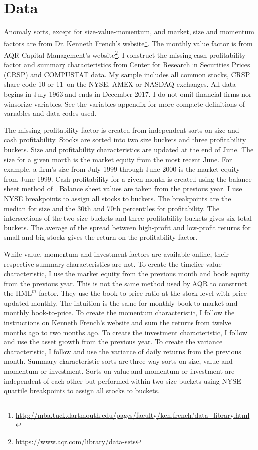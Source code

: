 
\section*{Data}

Anomaly sorts, except for size-value-momentum, and market, size and
momentum factors are from Dr. Kenneth French's website\footnote{
\url{http://mba.tuck.dartmouth.edu/pages/faculty/ken.french/data_library.html}
}. The monthly value factor is from AQR Capital Management's website\footnote{
\url{https://www.aqr.com/library/data-sets}
}.
I construct the missing cash profitability factor and summary characteristics
from Center for Research in Securities Prices (CRSP) and COMPUSTAT data. My
sample includes all common stocks, CRSP share code 10 or 11, on the NYSE, AMEX
or NASDAQ exchanges. All data begins in July 1963 and ends in December 2017. I
do not omit financial firms nor winsorize variables. See the variables appendix
for more complete definitions of variables and data codes used.

The missing profitability factor is created from independent sorts on size and
cash profitability.
Stocks are sorted into two size buckets and three profitability buckets.
Size and profitability characteristics are updated at the end of June.
The size for a given month is the market equity from the most recent June.
For example, a firm’s size from July 1999 through June 2000 is the market
equity from June 1999.
Cash profitability for a given month is created using the balance sheet method
of \textcite{ball2016accruals}.
Balance sheet values are taken from the previous year. 
I use NYSE breakpoints to assign all stocks to buckets.
The breakpoints are the median for size and the 30th and 70th percentiles for
profitability.
The intersections of the two size buckets and three profitability buckets
gives six total buckets.
The average of the spread between high-profit and low-profit returns for small
and big stocks gives the return on the profitability factor.

While value, momentum and investment factors are available online, their
respective summary characteristics are not.
To create the timelier value characteristic, I use the market equity from the
previous month and book equity from the previous year.
This is not the same method used by AQR to construct the $\text{HML}^m$ factor.
They use the book-to-price ratio at the stock level with price updated monthly.
The intuition is the same for monthly book-to-market and monthly book-to-price.
To create the momentum characteristic, I follow the instructions on Kenneth
French’s website and sum the returns from twelve months ago to two months ago.
To create the investment characteristic, I follow \textcite{fama2015five} and
use the asset growth from the previous year.
To create the variance characteristic, I follow
\textcite{moreira2017volatility} and use the variance of daily returns from the
previous month.
Summary characteristic sorts are three-way sorts on size, value and momentum or
investment.
Sorts on value and momentum or investment are independent of each other but
performed within two size buckets using NYSE quartile breakpoints to assign all
stocks to buckets.


